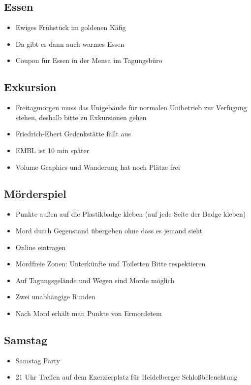   \subsection*{Essen}
    \begin{itemize}
      \item Ewiges Frühstück im goldenen Käfig
      \item Da gibt es dann auch warmes Essen
      \item Coupon für Essen in der Mensa im Tagungsbüro
    \end{itemize}

  \subsection*{Exkursion}
    \begin{itemize}
    \item Freitagmorgen muss das Unigebäude für normalen Unibetrieb zur Verfügung stehen, deshalb bitte zu Exkursionen gehen
    \item Friedrich-Ebert Gedenkstätte fällt aus
    \item EMBL ist 10 min später
    \item Volume Graphics und Wanderung hat noch Plätze frei
    \end{itemize}

  \subsection*{Mörderspiel}
    \begin{itemize}
      \item Punkte außen auf die Plastikbadge kleben (auf jede Seite der Badge kleben)
      \item Mord durch Gegenstand übergeben ohne dass es jemand sieht
      \item Online eintragen
      \item Mordfreie Zonen: Unterkünfte und Toiletten Bitte respektieren
      \item Auf Tagungsgelände und Wegen sind Morde möglich
      \item Zwei unabhängige Runden
      \item Nach Mord erhält man Punkte von Ermordetem
    \end{itemize}

  \subsection*{Samstag}
    \begin{itemize}
      \item Samstag Party
      \item 21 Uhr Treffen auf dem Exerzierplatz für Heidelberger Schloßbeleuchtung
    \end{itemize}

